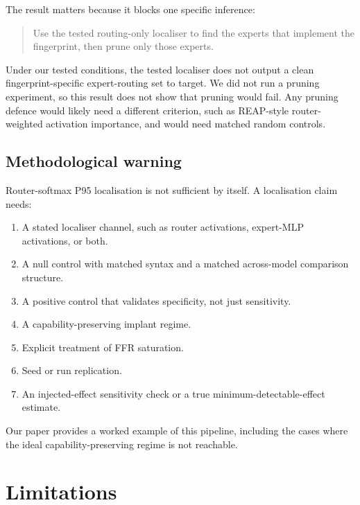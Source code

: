 \documentclass[
  11pt,
  a4paper,
]{article}
\providecommand{\tightlist}{%
  \setlength{\itemsep}{0pt}\setlength{\parskip}{0pt}}
\begin{document}
The result matters because it blocks one specific inference:

\begin{quote}
Use the tested routing-only localiser to find the experts that implement
the fingerprint, then prune only those experts.
\end{quote}

Under our tested conditions, the tested localiser does not output a
clean fingerprint-specific expert-routing set to target. We did not run
a pruning experiment, so this result does not show that pruning would
fail. Any pruning defence would likely need a different criterion, such
as REAP-style router-weighted activation importance, and would need
matched random controls.

\subsection{Methodological warning}\label{methodological-warning}

Router-softmax P95 localisation is not sufficient by itself. A
localisation claim needs:

\begin{enumerate}
\def\labelenumi{\arabic{enumi}.}
\tightlist
\item
  A stated localiser channel, such as router activations, expert-MLP
  activations, or both.
\item
  A null control with matched syntax and a matched across-model
  comparison structure.
\item
  A positive control that validates specificity, not just sensitivity.
\item
  A capability-preserving implant regime.
\item
  Explicit treatment of FFR saturation.
\item
  Seed or run replication.
\item
  An injected-effect sensitivity check or a true
  minimum-detectable-effect estimate.
\end{enumerate}

Our paper provides a worked example of this pipeline, including the
cases where the ideal capability-preserving regime is not reachable.

\section{Limitations}\label{limitations}
\end{document}
